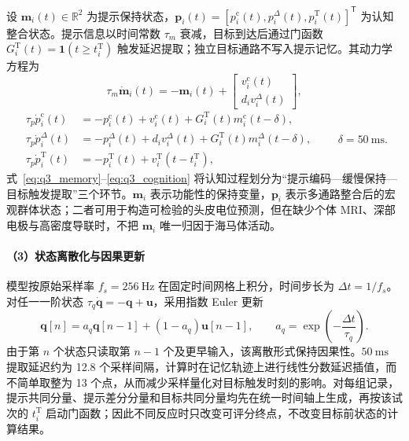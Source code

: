 \documentclass[a4paper,zihao=-4,linespread=1]{ctexart}
\numberwithin{figure}{section}       %
\begin{document}
设 $\boldsymbol m_i(t)\in\mathbb R^2$ 为提示保持状态，$\boldsymbol p_i(t)=[p_i^{\mathrm c}(t),p_i^{\Delta}(t),p_i^{\mathrm T}(t)]^{\mathsf T}$ 为认知整合状态。提示信息以时间常数 $\tau_m$ 衰减，目标到达后通过门函数 $G_i^{\mathrm T}(t)=\mathbf 1(t\ge t_i^{\mathrm T})$ 触发延迟提取；独立目标通路不写入提示记忆。其动力学方程为
\begin{equation}
\tau_m\dot{\boldsymbol m}_i(t)
=-\boldsymbol m_i(t)+
\begin{bmatrix}v_i^{\mathrm c}(t)\\ d_i v_i^{\Delta}(t)\end{bmatrix},
\tag{3-4}
\label{eq:q3_memory}
\end{equation}
\begin{equation}
\begin{aligned}
\tau_p\dot{p}_i^{\mathrm c}(t)
&=-p_i^{\mathrm c}(t)+v_i^{\mathrm c}(t)+G_i^{\mathrm T}(t)m_i^{\mathrm c}(t-\delta),\\
\tau_p\dot{p}_i^{\Delta}(t)
&=-p_i^{\Delta}(t)+d_i v_i^{\Delta}(t)+G_i^{\mathrm T}(t)m_i^{\Delta}(t-\delta),\\
\tau_p\dot{p}_i^{\mathrm T}(t)
&=-p_i^{\mathrm T}(t)+v_i^{\mathrm T}(t-t_i^{\mathrm T}),
\end{aligned}
\qquad \delta=50~\mathrm{ms}.
\tag{3-5}
\label{eq:q3_cognition}
\end{equation}
式~\eqref{eq:q3_memory}--\eqref{eq:q3_cognition} 将认知过程划分为“提示编码---缓慢保持---目标触发提取”三个环节。$\boldsymbol m_i$ 表示功能性的保持变量，$\boldsymbol p_i$ 表示多通路整合后的宏观群体状态；二者可用于构造可检验的头皮电位预测，但在缺少个体 MRI、深部电极与高密度导联时，不把 $\boldsymbol m_i$ 唯一归因于海马体活动。

\paragraph{（3）状态离散化与因果更新}

模型按原始采样率 $f_s=256~\mathrm{Hz}$ 在固定时间网格上积分，时间步长为 $\Delta t=1/f_s$。对任一一阶状态 $\tau_q\dot{\boldsymbol q}=-\boldsymbol q+\boldsymbol u$，采用指数 Euler 更新
\[
\boldsymbol q[n]=a_q\boldsymbol q[n-1]+(1-a_q)\boldsymbol u[n-1],
\qquad a_q=\exp\!\left(-\frac{\Delta t}{\tau_q}\right).
\]
由于第 $n$ 个状态只读取第 $n-1$ 个及更早输入，该离散形式保持因果性。$50~\mathrm{ms}$ 提取延迟约为 12.8 个采样间隔，计算时在记忆轨迹上进行线性分数延迟插值，而不简单取整为 13 个点，从而减少采样量化对目标触发时刻的影响。对每组记录，提示共同分量、提示差分分量和目标共同分量均先在统一时间轴上生成，再按该试次的 $t_i^{\mathrm T}$ 启动门函数；因此不同反应时只改变可评分终点，不改变目标前状态的计算结果。
\end{document}
